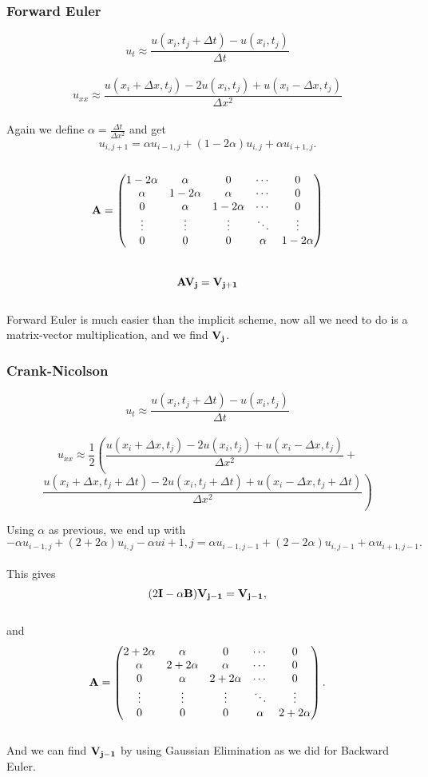 \documentclass[a4paper,12pt, english]{article}
\begin{document}
\subsubsection*{Forward Euler}
$$u_t \approx \frac{u(x_i,t_j + \Delta t) - u(x_i,t_j)}{\Delta t}$$
\\
$$u_{xx} \approx \frac{u(x_i + \Delta x,t_j) - 2u(x_i,t_j) + u(x_i - \Delta x,t_j)}{\Delta x^2}$$
\\
Again we define $\alpha = \frac{\Delta t}{\Delta x^2}$ and get 
\\
$$u_{i,j+1} = \alpha u_{i-1,j} + (1 - 2\alpha)u_{i,j} + \alpha u_{i+1,j}.$$
\\
$$\bf A = \begin{pmatrix}
1 - 2\alpha & \alpha & 0 & \cdots & 0 \\
\alpha & 1 - 2\alpha & \alpha & \cdots & 0\\
0 & \alpha & 1 - 2\alpha & \cdots & 0\\
\vdots  & \vdots  & \vdots & \ddots & \vdots  \\
0 & 0 & 0 & \alpha & 1 - 2\alpha
\end{pmatrix}
$$
\\
$$\bf A \bf V_j = \bf V_{j+1}$$
\\
Forward Euler is much easier than the implicit scheme, now all we need to do is a matrix-vector multiplication, and we find $\bf V_j$.

\subsubsection*{Crank-Nicolson}
$$u_t \approx \frac{u(x_i,t_j + \Delta t) - u(x_i,t_j)}{\Delta t}$$
\\
\[
u_{xx} \approx \frac{1}{2} \left(\frac{u(x_i + \Delta x,t_j) - 2u(x_i,t_j) + u(x_i - \Delta x,t_j)}{\Delta x^2} +\right.
 \]
\[
\left.\frac{u(x_i + \Delta x,t_j + \Delta t) - 2u(x_i,t_j+ \Delta t) + u(x_i - \Delta x,t_j + \Delta t)}{\Delta x^2}\right)
\]

Using $\alpha$ as previous, we end up with
\\
$$-\alpha u_{i-1,j} + (2 + 2\alpha)u_{i,j} - \alpha u{i+1,j} = \alpha u_{i-1,j-1} + (2 - 2\alpha)u_{i,j-1} + \alpha u_{i+1,j-1}.$$
\\
This gives 
\\
$$(2\bf I - \alpha \bf B) \bf V_{j-1} = \bf V_{j-1},$$
\\
and 
\\
$$\bf A = \begin{pmatrix}
2 + 2\alpha & \alpha & 0 & \cdots & 0 \\
\alpha & 2 + 2\alpha & \alpha & \cdots & 0\\
0 & \alpha & 2 + 2\alpha & \cdots & 0\\
\vdots  & \vdots  & \vdots & \ddots & \vdots  \\
0 & 0 & 0 & \alpha & 2 + 2\alpha
\end{pmatrix}
.$$
\\
And we can find $\bf V_{j-1}$ by using Gaussian Elimination as we did for Backward Euler.
\\
\end{document}

